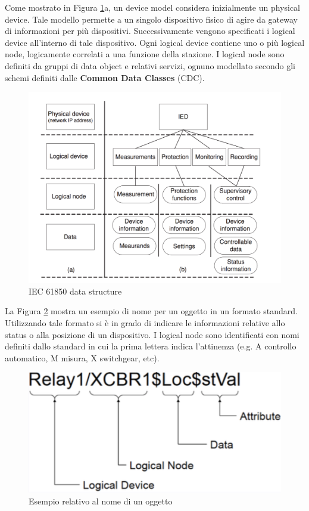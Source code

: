 Come mostrato in Figura \ref{fig:iec61850ds}a, un device model considera inizialmente un physical device. Tale modello permette a un singolo dispositivo fisico di agire da gateway di informazioni per più dispositivi. Successivamente vengono specificati i logical device all'interno di tale dispositivo. Ogni logical device contiene uno o più logical node, logicamente correlati a una funzione della stazione. I logical node sono definiti da gruppi di data object e relativi servizi, ognuno modellato secondo gli schemi definiti dalle \textbf{Common Data Classes} (CDC).\newline
\begin{figure}[h]
	\centering
	\includegraphics[scale=0.350]{imgs/iec61850ds.png}
	\caption{IEC 61850 data structure} \label{fig:iec61850ds}
\end{figure}\newline
La Figura \ref{fig:name_obj} mostra un esempio di nome per un oggetto in un formato standard. Utilizzando tale formato si è in grado di indicare le informazioni relative allo status o alla posizione di un dispositivo. I logical node sono identificati con nomi definiti dallo standard in cui la prima lettera indica l'attinenza (e.g. A controllo automatico, M misura, X switchgear, etc).
\begin{figure}[h]
	\centering
	\includegraphics[scale=0.350]{imgs/name_obj.png}
	\caption{Esempio relativo al nome di un oggetto} \label{fig:name_obj}
\end{figure}
